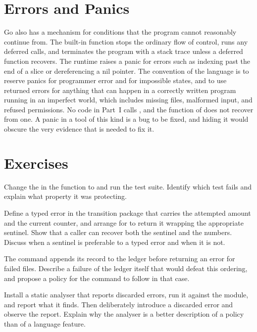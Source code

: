\section{Errors and Panics}

Go also has a mechanism for conditions that the program cannot reasonably continue from. The built-in function  stops the ordinary flow of control, runs any deferred calls, and terminates the program with a stack trace unless a deferred function recovers. The runtime raises a panic for errors such as indexing past the end of a slice or dereferencing a nil pointer. The convention of the language is to reserve panics for programmer error and for impossible states, and to use returned errors for anything that can happen in a correctly written program running in an imperfect world, which includes missing files, malformed input, and refused permissions. No code in Part~I calls , and the  function of \golab{} does not recover from one. A panic in a tool of this kind is a bug to be fixed, and hiding it would obscure the very evidence that is needed to fix it.

\section*{Exercises}

\begin{exercise}
Change the  in the  function to  and run the test suite. Identify which test fails and explain what property it was protecting.
\end{exercise}

\begin{exercise}
Define a typed error in the transition package that carries the attempted amount and the current counter, and arrange for  to return it wrapping the appropriate sentinel. Show that a caller can recover both the sentinel and the numbers. Discuss when a sentinel is preferable to a typed error and when it is not.
\end{exercise}

\begin{exercise}
The  command appends its record to the ledger before returning an error for failed files. Describe a failure of the ledger itself that would defeat this ordering, and propose a policy for the command to follow in that case.
\end{exercise}

\begin{exercise}
Install a static analyser that reports discarded errors, run it against the module, and report what it finds. Then deliberately introduce a discarded error and observe the report. Explain why the analyser is a better description of a policy than of a language feature.
\end{exercise}

